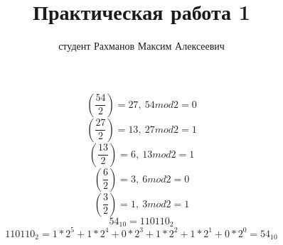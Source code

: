 \documentclass[a4paper,11pt]{article}
\title{Практическая работа 1}
\author{студент Рахманов Максим Алексеевич}
\begin{document}
\maketitle
$$\left( \frac{54}{2} \right) =27,\  54 mod 2=0$$
$$\left( \frac{27}{2} \right) =13,\  27 mod 2=1$$
$$\left( \frac{13}{2} \right) =6,\  13 mod 2=1$$
$$\left( \frac{6}{2} \right) =3,\  6 mod 2=0$$
$$\left( \frac{3}{2} \right) =1,\  3 mod 2=1$$
$$54_10=110110_2$$
$$110110_2=1*2^5+1*2^4+0*2^3+1*2^2+1*2^1+0*2^0=54_10$$
\end{document}
